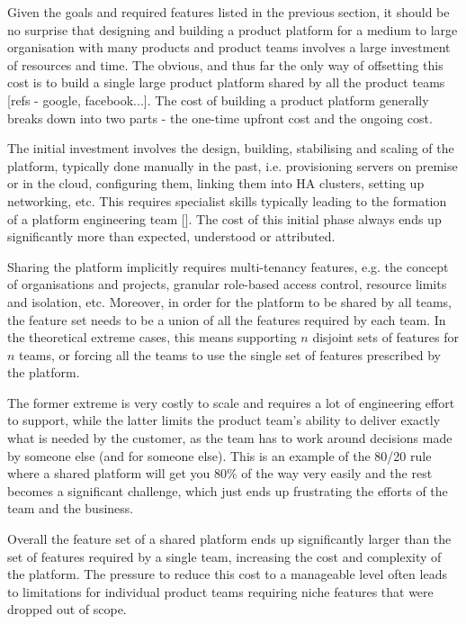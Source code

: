 \documentclass[reprint,amsmath,amssymb,aps]{revtex4-1}
\begin{document}
Given the goals and required features listed in the previous section, it should be no surprise that designing and building a product platform for a medium to large organisation with many products and product teams involves a large investment of resources and time. The obvious, and thus far the only way of offsetting this cost is to build a single large product platform shared by all the product teams [refs - google, facebook...]. The cost of building a product platform generally breaks down into two parts - the one-time upfront cost and the ongoing cost.

The initial investment involves the design, building, stabilising and scaling of the platform, typically done manually in the past, i.e. provisioning servers on premise or in the cloud, configuring them, linking them into HA clusters, setting up networking, etc. This requires specialist skills typically leading to the formation of a platform engineering team []. The cost of this initial phase always ends up significantly more than expected, understood or attributed.

Sharing the platform implicitly requires multi-tenancy features, e.g. the concept of organisations and projects, granular role-based access control, resource limits and isolation, etc. Moreover, in order for the platform to be shared by all teams, the feature set needs to be a union of all the features required by each team. In the theoretical extreme cases, this means supporting $n$ disjoint sets of features for $n$ teams, or forcing all the teams to use the single set of features prescribed by the platform.

The former extreme is very costly to scale and requires a lot of engineering effort to support, while the latter limits the product team’s ability to deliver exactly what is needed by the customer, as the team has to work around decisions made by someone else (and for someone else). This is an example of the 80/20 rule where a shared platform will get you 80\% of the way very easily and the rest becomes a significant challenge, which just ends up frustrating the efforts of the team and the business.

Overall the feature set of a shared platform ends up significantly larger than the set of features required by a single team, increasing the cost and complexity of the platform. The pressure to reduce this cost to a manageable level often leads to limitations for individual product teams requiring niche features that were dropped out of scope.
\end{document}
